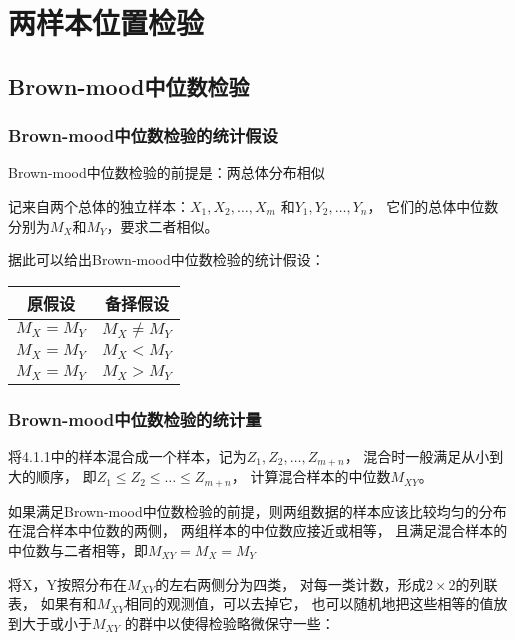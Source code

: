 \documentclass[UTF8]{ctexart}
\numberwithin{equation}{section}
\begin{document}
\clearpage
\section{两样本位置检验}

\subsection{Brown-mood中位数检验}

\subsubsection{Brown-mood中位数检验的统计假设}

Brown-mood中位数检验的前提是：两总体分布相似

记来自两个总体的独立样本：$X_1,X_2,\dots,X_m$
和$Y_1, Y_2, \dots, Y_n$，
它们的总体中位数分别为$M_X$和$M_Y$，要求二者相似。

据此可以给出Brown-mood中位数检验的统计假设：

\begin{center}
    \begin{tabular}{cc}
        \toprule
        原假设 & 备择假设 \\
        \midrule
        $M_X = M_Y$ & $M_X \neq M_Y$ \\
        $M_X = M_Y$ & $M_X < M_Y$ \\
        $M_X = M_Y$ & $M_X > M_Y$ \\
        \bottomrule
    \end{tabular}
\end{center}

\subsubsection{Brown-mood中位数检验的统计量}

将4.1.1中的样本混合成一个样本，记为$Z_1, Z_2, \dots, Z_{m+n}$，
混合时一般满足从小到大的顺序，
即$Z_1 \le Z_2 \le \dots \le Z_{m+n}$，
计算混合样本的中位数$M_{XY}$。

如果满足Brown-mood中位数检验的前提，则两组数据的样本应该比较均匀的分布在混合样本中位数的两侧，
两组样本的中位数应接近或相等，
且满足混合样本的中位数与二者相等，即$M_{XY} = M_X = M_Y$

将X，Y按照分布在$M_{XY}$的左右两侧分为四类，
对每一类计数，形成$2 \times 2$的列联表，
如果有和$M_{XY}$相同的观测值，可以去掉它，
也可以随机地把这些相等的值放到大于或小于$M_{XY}$
的群中以使得检验略微保守一些：
\end{document}
